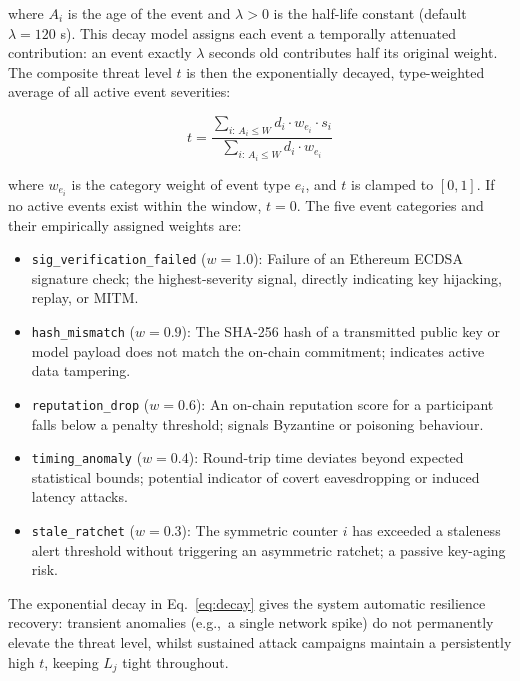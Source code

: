 \documentclass[journal, 10pt, twocolumn]{IEEEtran}
\begin{document}
where $A_i$ is the age of the event and $\lambda > 0$ is the half-life constant (default $\lambda = 120$ s). This decay model assigns each event a temporally attenuated contribution: an event exactly $\lambda$ seconds old contributes half its original weight. The composite threat level $t$ is then the exponentially decayed, type-weighted average of all active event severities:

\begin{equation}
t = \frac{\displaystyle\sum_{i:\, A_i \leq W} d_i \cdot w_{e_i} \cdot s_i}{\displaystyle\sum_{i:\, A_i \leq W} d_i \cdot w_{e_i}}
\label{eq:threat}
\end{equation}

where $w_{e_i}$ is the category weight of event type $e_i$, and $t$ is clamped to $[0, 1]$. If no active events exist within the window, $t = 0$. The five event categories and their empirically assigned weights are:

\begin{itemize}
    \item \texttt{sig\_verification\_failed} ($w = 1.0$): Failure of an Ethereum ECDSA signature check; the highest-severity signal, directly indicating key hijacking, replay, or MITM.
    \item \texttt{hash\_mismatch} ($w = 0.9$): The SHA-256 hash of a transmitted public key or model payload does not match the on-chain commitment; indicates active data tampering.
    \item \texttt{reputation\_drop} ($w = 0.6$): An on-chain reputation score for a participant falls below a penalty threshold; signals Byzantine or poisoning behaviour.
    \item \texttt{timing\_anomaly} ($w = 0.4$): Round-trip time deviates beyond expected statistical bounds; potential indicator of covert eavesdropping or induced latency attacks.
    \item \texttt{stale\_ratchet} ($w = 0.3$): The symmetric counter $i$ has exceeded a staleness alert threshold without triggering an asymmetric ratchet; a passive key-aging risk.
\end{itemize}

The exponential decay in Eq.~\eqref{eq:decay} gives the system automatic resilience recovery: transient anomalies (e.g.,\ a single network spike) do not permanently elevate the threat level, whilst sustained attack campaigns maintain a persistently high $t$, keeping $L_j$ tight throughout.

\end{document}
